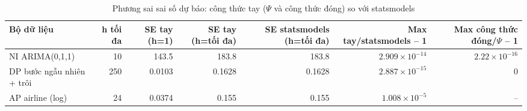 \begin{table}[H]
\centering\small
\caption{Phương sai sai số dự báo: công thức tay ($\Psi$ và công thức đóng) so với statsmodels}\label{tab:tab_b12_08_forecast_variance}
\begin{adjustbox}{max width=\linewidth}
\begin{tabular}{lrrrrrr}
\toprule
Bộ dữ liệu & h tối đa & SE tay (h=1) & SE tay (h=tối đa) & SE statsmodels (h=tối đa) & Max \textbar{}tay/statsmodels – 1\textbar{} & Max \textbar{}công thức đóng/$\Psi$ – 1\textbar{} \\
\midrule
NI ARIMA(0,1,1) & 10 & 143.5 & 183.8 & 183.8 & $2.909\times10^{-14}$ & $2.22\times10^{-16}$ \\
DP bước ngẫu nhiên + trôi & 250 & 0.0103 & 0.1628 & 0.1628 & $2.887\times10^{-15}$ & 0 \\
AP airline (log) & 24 & 0.0374 & 0.155 & 0.155 & $1.008\times10^{-5}$ & – \\
\bottomrule
\end{tabular}
\end{adjustbox}
\end{table}
